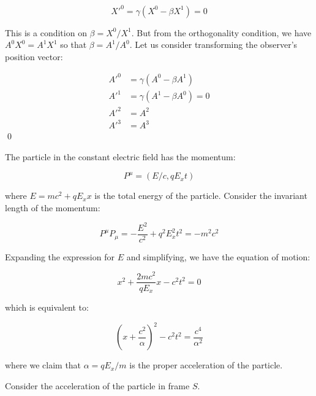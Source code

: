 \documentclass[12pt]{article}
\begin{document}
\begin{equation}
    X'^{0} = \gamma (X^{0} - \beta X^{1}) = 0
\end{equation}

This is a condition on $\beta = X^{0}/X^{1}$. But from the orthogonality condition, we have $A^{0} X^{0} = A^{1} X^{1}$ so that $\beta = A^{1}/A^{0}$. Let us consider transforming the observer's position vector:

\begin{equation}
    \begin{split}
        A'^{0} &= \gamma (A^{0} - \beta A^{1}) \\
        A'^{1} &= \gamma (A^{1} - \beta A^{0}) = 0 \\
        A'^{2} &= A^{2} \\
        A'^{3} &= A^{3}
    \end{split}
\end{equation}
\qed



The particle in the constant electric field has the momentum:

\begin{equation}
    P^{\mu} = (E/c, qE_{x}t)
\end{equation}

where $E = mc^{2} + qE_{x}x$ is the total energy of the particle.
Consider the invariant length of the momentum:

\begin{equation}
    P^{\mu} P_{\mu} = -\frac{E^{2}}{c^{2}} + q^{2}E_{x}^{2}t^{2} = -m^{2}c^{2}
\end{equation}

Expanding the expression for $E$ and simplifying, we have the equation of motion:

\begin{equation}
    x^{2} + \frac{2mc^{2}}{qE_{x}} x - c^{2}t^{2} = 0
\end{equation}

which is equivalent to:

\begin{equation}
    \left( x + \frac{c^{2}}{\alpha} \right)^{2} - c^{2}t^{2} = \frac{c^{4}}{\alpha^{2}}
\end{equation}

where we claim that $\alpha = qE_{x}/m$ is the proper acceleration of the particle.

Consider the acceleration of the particle in frame $S$.
\end{document}
